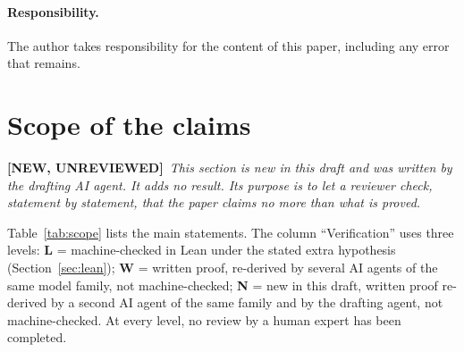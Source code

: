 \documentclass[11pt,a4paper]{article}
\newcommand{\NEWU}{\textbf{[NEW, UNREVIEWED]}}
\theoremstyle{definition}
\theoremstyle{remark}
\begin{document}
\paragraph{Responsibility.} The author takes responsibility for the content of this paper,
including any error that remains.

\section{Scope of the claims}\label{sec:scope}

\noindent\NEWU\ \emph{This section is new in this draft and was written by the drafting AI
agent. It adds no result. Its purpose is to let a reviewer check, statement by statement,
that the paper claims no more than what is proved.}

\medskip
Table~\ref{tab:scope} lists the main statements. The column ``Verification'' uses three
levels: \textbf{L} = machine-checked in Lean under the stated extra hypothesis
(Section~\ref{sec:lean}); \textbf{W} = written proof, re-derived by several AI agents of the
same model family, not machine-checked; \textbf{N} = new in this draft, written proof
re-derived by a second AI agent of the same family and by the drafting agent, not
machine-checked. At every level, no review by a human expert has been completed.
\end{document}
